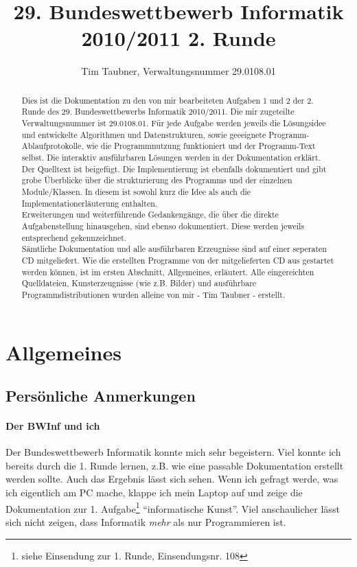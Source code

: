 \documentclass[a4paper,11pt]{scrartcl}
\title{29. Bundeswettbewerb Informatik 2010/2011 2. Runde}
\author{Tim Taubner, Verwaltungsnummer 29.0108.01}
\begin{document}

\maketitle
\vfill
\begin{abstract}
 Dies ist die Dokumentation zu den von mir bearbeiteten Aufgaben 1 und 2 der 2. Runde des 29.
 Bundeswettbewerbs Informatik 2010/2011. Die mir zugeteilte Verwaltungsnummer ist 29.0108.01.
 Für jede Aufgabe werden jeweils die Lösungsidee und entwickelte Algorithmen und Datenstrukturen,
 sowie geeeignete Programm-Ab\-lauf\-pro\-to\-kol\-le, wie die Programmnutzung funktioniert und der Programm-Text selbst.
 Die interaktiv aus\-führ\-baren Lösungen werden in der Dokumentation erklärt. Der Quelltext ist beigefügt.
 Die Implementierung ist ebenfalls dokumentiert und gibt grobe Überblicke über die strukturierung des Programms und der einzelnen Module/Klassen.
 In diesem ist sowohl kurz die Idee als auch die Implementationerläuterung enthalten. \\
 Erweiterungen und weiterführende Gedankengänge, die über die direkte Aufgabenstellung hinausgehen, sind ebenso dokumentiert.
 Diese werden jeweils entsprechend gekennzeichnet.\\
 Sämtliche Dokumentation und alle ausführbaren Erzeugnisse sind auf einer seperaten CD mitgeliefert.
 Wie die erstellten Programme von der mitgelieferten CD aus gestartet werden können, ist im ersten Abschnitt, Allgemeines, erläutert.
 Alle eingereichten Quelldateien, Kunsterzeugnisse (wie z.B. Bilder) und ausführbare Programmdistributionen wurden alleine von mir - Tim Taubner - erstellt.
\end{abstract}
\vfill
\renewcommand{\stctitle}{Inhalt der Aufgabendokumentation}
\nostcrule
\setcounter{secttocdepth}{3}
\setcounter{tocdepth}{1}
\dosecttoc
\tableofcontents
\dosecttoc
%
\newpage


\section{Allgemeines}
\subsection{Persönliche Anmerkungen} %
\paragraph{Der BWInf und ich}
 Der Bundeswettbewerb Informatik konnte mich sehr begeistern.
 Viel konnte ich bereits durch die 1. Runde lernen, z.B. wie eine passable Dokumentation erstellt werden sollte.
 Auch das Ergebnis lässt sich sehen. Wenn ich gefragt werde, was ich eigentlich am PC mache,
 klappe ich mein Laptop auf und zeige die Dokumentation zur 1. Aufgabe\footnote{siehe Einsendung zur 1. Runde, Einsendungsnr. 108}  ``informatische Kunst''.
 Viel anschaulicher lässt sich nicht zeigen, dass Informatik \emph{mehr} als nur Programmieren ist.
\end{document}
